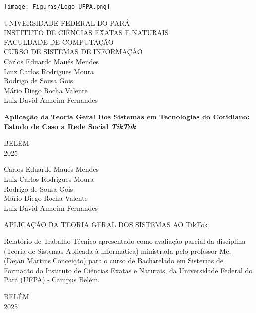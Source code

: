 
\begin{center}
    \thispagestyle{empty} %
    \texttt{[image: Figuras/Logo UFPA.png]}
    \onehalfspacing

    UNIVERSIDADE FEDERAL DO PARÁ \\
    INSTITUTO DE CIÊNCIAS EXATAS E NATURAIS \\
    FACULDADE DE COMPUTAÇÃO\\
    CURSO DE SISTEMAS DE INFORMAÇÃO \\
    
    \vspace{4cm}
    Carlos Eduardo Maués Mendes\\
    Luiz Carlos Rodrigues Moura\\
    Rodrigo de Sousa Gois\\
    Mário Diego Rocha Valente\\
    Luiz David Amorim Fernandes\\
    \vspace{5cm}
    
    \textbf{Aplicação da Teoria Geral Dos Sistemas em Tecnologias do Cotidiano: Estudo de Caso a Rede Social \textit{TikTok}}\\
    \vspace{5cm}
    
    BELÉM\\
    2025\\
    

    \newpage
    \setcounter{page}{1} %
    \thispagestyle{empty}
    
    Carlos Eduardo Maués Mendes\\
    Luiz Carlos Rodrigues Moura\\
    Rodrigo de Sousa Gois\\
    Mário Diego Rocha Valente\\
    Luiz David Amorim Fernandes\\
    \vspace{5cm}
    
    APLICAÇÃO DA TEORIA GERAL DOS SISTEMAS AO TikTok\\
    \vspace{5cm}
    
\end{center}

\singlespacing
\hspace{8cm} %
\begin{minipage}{7cm}
Relatório de Trabalho Técnico apresentado como avaliação parcial da disciplina (Teoria de Sistemas Aplicada à Informática) ministrada pelo professor Mc. (Dejan Martins Conceição) para o curso de Bacharelado em Sistemas de Formação do Instituto de Ciências Exatas e Naturais, da Universidade Federal do Pará (UFPA) - Campus Belém. 
\end{minipage}
\vspace{4cm}

\onehalfspacing
\begin{center}
    BELÉM\\
    2025
\end{center}

\newpage
\thispagestyle{empty}
\begin{center}
\tableofcontents


\end{center}
